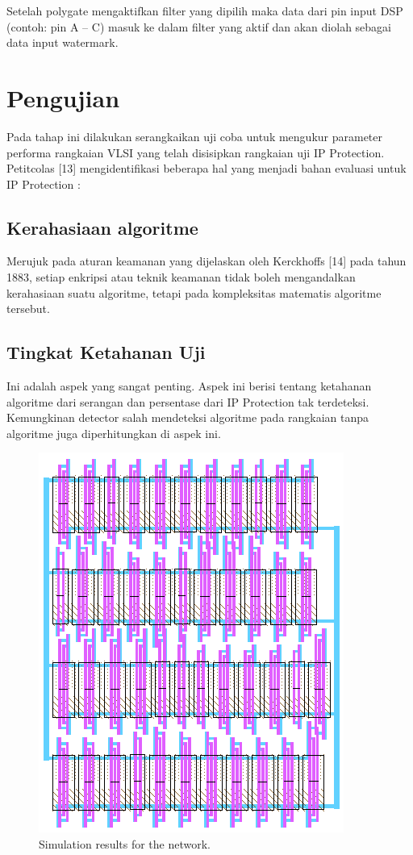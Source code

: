 Setelah polygate mengaktifkan filter yang dipilih maka data dari pin input
DSP (contoh: pin A – C) masuk ke dalam filter yang aktif dan akan diolah sebagai
data input watermark.

\section{Pengujian}

Pada tahap ini dilakukan serangkaikan uji coba untuk mengukur parameter
performa rangkaian VLSI yang telah disisipkan rangkaian uji IP Protection.
Petitcolas [13] mengidentifikasi beberapa hal yang menjadi bahan evaluasi untuk
IP Protection :

\subsection{Kerahasiaan algoritme}

Merujuk pada aturan keamanan yang dijelaskan oleh Kerckhoffs [14] pada
tahun 1883, setiap enkripsi atau teknik keamanan tidak boleh mengandalkan
kerahasiaan suatu algoritme, tetapi pada kompleksitas matematis algoritme
tersebut.

\subsection{Tingkat Ketahanan Uji}

Ini adalah aspek yang sangat penting. Aspek ini berisi tentang ketahanan
algoritme dari serangan dan persentase dari IP Protection tak terdeteksi.
Kemungkinan detector salah mendeteksi algoritme pada rangkaian tanpa
algoritme juga diperhitungkan di aspek ini.

\begin{figure}[!h]
	\centering
	\includegraphics[scale=0.8]{images/gate1}
	\caption{Simulation results for the network.}
	\label{fig_sim}
\end{figure}

